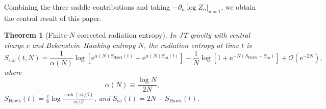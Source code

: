 \documentclass[12pt,a4paper]{article}
\newtheorem{theorem}{Theorem}[section]
\newcommand{\Srad}{S_{\mathrm{rad}}}
\newcommand{\SHawk}{S_{\mathrm{Hawk}}}
\newcommand{\Sisl}{S_{\mathrm{isl}}}
\newcommand{\OO}{\mathcal{O}}
\newcommand{\e}{\mathrm{e}}
\begin{document}
Combining the three saddle contributions and taking $-\partial_n\log Z_n|_{n=1}$,
we obtain the central result of this paper.

\begin{theorem}[Finite-$N$ corrected radiation entropy]
\label{thm:main}
In JT gravity with central charge $c$ and Bekenstein--Hawking entropy $N$,
the radiation entropy at time $t$ is
\begin{equation}
  \boxed{
  \Srad(t,N) = \frac{1}{\alpha(N)}\log\!\left[\e^{\alpha(N)\SHawk(t)}
    + \e^{\alpha(N)\Sisl(t)}\right]
    - \frac{1}{N}\log\!\left[1 + \e^{-N(\SHawk - \Sisl)}\right]
    + \OO\!\left(\e^{-2N}\right),
  }
\label{eq:main_result}
\end{equation}
where
\begin{equation}
  \alpha(N) \equiv \frac{\log N}{2N},
\label{eq:alpha_def}
\end{equation}
$\SHawk(t) = \frac{c}{6}\log\frac{\sinh(\pi t/\beta)}{\pi\epsilon/\beta}$,
and $\Sisl(t) = 2N - \SHawk(t)$.
\end{theorem}
\end{document}
